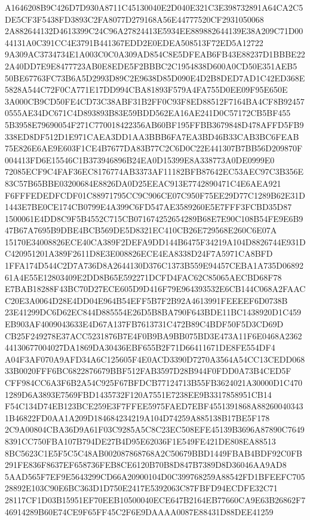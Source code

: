 \documentclass[UTF8,fontset=fandol,zihao=-4,a4paper]{ctexart}
\begin{document}
{{A1646208B9C426D7D930A8711C45130040E2D040E321C3E398732891A64CA2C5DE5CF3F5438FD3893C2FA8077D279168A56E44777520CF2931050068
2A882644132D4613399C24C96A27824413E5934EE889882644139E38A209C71D0044131A0C391CC4E3791B441367EDD2E0EDEA508513F72ED5A12722
9A309AC3734734E1A003C0C0A309AD854C8E5DFEAB6FB43E88237D1BBBE222A40DD7E9E8477723AB0E8EDE5F2BBBC2C1954838D600A0CD50E351AEB5
50BE67763FC73B6A5D2993D89C2E9638D85D090E4D2B8DED7AD1C42ED368E5828A544C72F0CA771E17DD994CBA81893F579A4FA755D0EE09F95E650E
3A000CB9CD50FE4CD73C38ABF31B2FF0C93F8ED88512F7164BA4CF8B924570555AE34DC671C4D893893B83E59BDD562EA16AE241D0C57172CB5BF455
5B3958E79690054F271C770018422356AB60BF195FFBB3679848D478AFFD5FB9338ED8DF512D1E971CAEA3DD1AA3BBB6FA7EA3BD46B33CAB3BC6FEAB
75E826E6AE9E603F1CE4B7677DA83B77C2C6D0C22E441307B7BB56D209870F004413FD6E15546C1B373946896B24EA0D15399E8A338773A0DE0999E0
72085ECF9C4FAF36EC8176774AB3373AF11182BFB87642EC53AEC97C3B356E83C57B65BBE03200684E8826DA0D25EEAC913E7742890471C4E6AEA921
F6FFFEDEDFCDF01C88971795CC9C906CE07C950F75EE29D77C1289B62E31D1443E7BE0CE174CB0799E4A399C6FD547AE3589260E5E7FFF3FCBD35D87
1500061E4DD8C9F5B4552C715CB071674252654289B68E7E90C108B54FE9E6B947B67A7695B9DBE4BCB569DE5D8321EC410CB26E729568E260C6E07A
15170E34008826ECE40CA389F2DEFA9DD144B6475F34219A104D8826744E931DC420951201A389F2611D8E3E008826ECE4EA8338D24F7A5971CA8BFD
1FFA174D544C2D7A736D8A2644130D376C1373B559E94457CEBA1A735D0689261A4E55E12803409E2DD8B65E592271DCFD4FAC62C85065AECBD68F78
E7BAB18288F43BC70D27ECE605D9D416F79E964393532E6CB144C068A2FAACC20E3A0064D28E4DD04E964B54EFF5B7F2B92A4613991FEEEEF6D0738B
23E41299DC6D62EC844D885554E26D5B8BA790F643BDE11BC1438920D1C459EB903AF4009043633E4D67A137FB7613731C472B89C4BDF50F5D3CD69D
CB25F249278E37ACC5231876B7E4F0B9BA9BB075BD3E473A11F6E0468A236244130677004027DA1869DA30436EBF655B2F71D66411671DE8FE554DF4
A04F3AF070A9AFD34A6C125605F4E0ACD3390D7270A3564A54CC13CEDD06833B0020FFF6BC6822876679BBF512FAB3597D28B944F0FDD0A73B4CED5F
CFF984CC6A3F6B2A54C925F67BFDCB77124713B55FB3624021A30000D1C4701289D6A3893E7569FBD1435732F120A7551E7238EE9B3317858951CB14
F54C134D74EB123BCE259E3F7FFEE5975FAED7EBF4551391868A882600403431B46822FD0AA1A209D184684234219A104D74259A885138B17BE5F178
2C9A00804CBA36D9A61F03C9285A5C8C23EC508EFE45139B3696A87890C76498391CC750FBA107B794DE27B4D95E62036F1E549FE421DE808EA88513
8BC5623C1E5F5C5C48AB002087868768A2C50679BBD1449FBAB4BDF92C0FB291FE836F8637EF658736FEB8CE6120B70B8D847B7389D8D36046AA9AD8
5AAD565F7EF9E5643299CD66A20900104D0C399768259A88542FD1BFEEFC70528892E103C90E6BC363D1D750E2417E5392063C87FBFD94ECDFE32C71
28117CF1D03B15951EF70EEB10500040ECE647B2164EB77660CA9E63B26862F746914289B60E74CE9F65FF45C2F6E9DAAAA0087E88431D88DEE41259
}}
\end{document}

